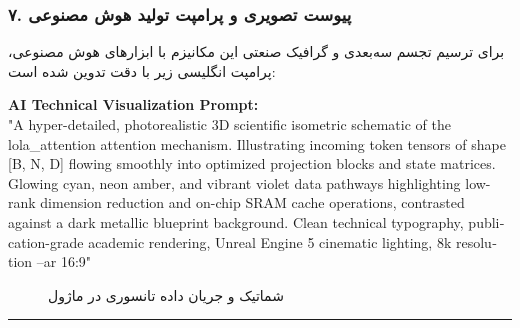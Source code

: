 \subsubsection*{۷. پیوست تصویری و پرامپت تولید هوش مصنوعی}
برای ترسیم تجسم سه‌بعدی و گرافیک صنعتی این مکانیزم با ابزارهای هوش مصنوعی، پرامپت انگلیسی زیر با دقت تدوین شده است:

\vspace{0.2cm}
\begin{latin}
\footnotesize
\textbf{AI Technical Visualization Prompt:}\\
"A hyper-detailed, photorealistic 3D scientific isometric schematic of the lola\_attention attention mechanism. Illustrating incoming token tensors of shape [B, N, D] flowing smoothly into optimized projection blocks and state matrices. Glowing cyan, neon amber, and vibrant violet data pathways highlighting low-rank dimension reduction and on-chip SRAM cache operations, contrasted against a dark metallic blueprint background. Clean technical typography, publication-grade academic rendering, Unreal Engine 5 cinematic lighting, 8k resolution --ar 16:9"
\end{latin}

\begin{figure}[H]
    \centering
    \caption{شماتیک و جریان داده تانسوری در ماژول }
    \label{fig:lola_attention}
\end{figure}

\vspace{0.5cm}
\hrule
\vspace{0.5cm}
